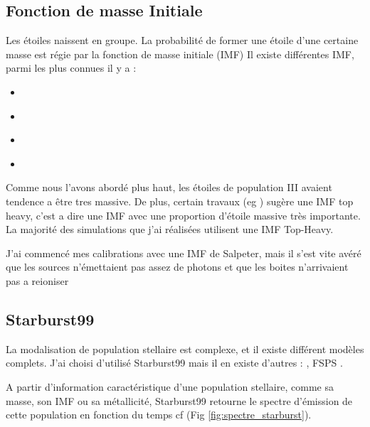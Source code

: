 


\subsection{Fonction de masse Initiale}

Les étoiles naissent en groupe.
La probabilité de former une étoile d'une certaine masse est régie par la fonction de masse initiale (IMF)
Il existe différentes IMF, parmi les plus connues il y a :

\begin{itemize}
\item \cite{1955ApJ...121..161S}
\item \cite{1979ApJS...41..513M}
\item \cite{2001MNRAS.322..231K}
\item \cite{2003PASP..115..763C}
\end{itemize}

Comme nous l'avons abordé plus haut, les étoiles de population III avaient tendence a être tres massive.
De plus, certain travaux (eg \cite{2003MNRAS.344L...7C} ) sugère une IMF top heavy, c'est a dire une IMF avec une proportion d'étoile massive très importante.
La majorité des simulations que j'ai réalisées utilisent une IMF Top-Heavy.

J'ai commencé mes calibrations avec une IMF de Salpeter, mais il s'est vite avéré que les sources n’émettaient pas assez de photons et que les boites n'arrivaient pas a reioniser


\subsection{Starburst99}


La modalisation de population stellaire est complexe, et il existe différent modèles complets.
J'ai choisi d'utilisé Starburst99 \citep{leitherer_starburst99:_1999} mais il en existe d'autres : \cite{2003MNRAS.344.1000B} , FSPS \cite{2009ApJ...699..486C}.  

A partir d'information caractéristique d'une population stellaire, comme sa masse, son IMF ou sa métallicité, Starburst99 retourne le spectre d'émission de cette population en fonction du temps cf (Fig \ref{fig:spectre_starburst}).

